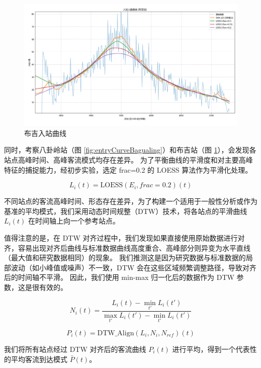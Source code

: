 \begin{figure}[htbp]
    \centering
    \includegraphics[width=1.0\textwidth]{res/Figure_3.png}
    \caption{布吉入站曲线}
    \label{fig:entryCurveBuji}
\end{figure}

同时，考察八卦岭站（图 \ref{fig:entryCurveBagualing}）和布吉站（图 \ref{fig:entryCurveBuji}），会发现各站点高峰时间、高峰客流模式均存在差异。
为了平衡曲线的平滑度和对主要高峰特征的捕捉能力，经初步实验，选定 frac=0.2 的 LOESS 算法作为平滑化处理。

$$
L_i(t) = \text{LOESS}(E_i, frac=0.2)(t)
$$

不同站点的客流高峰时间、形态存在差异，为了构建一个适用于一般性分析或作为基准的平均模式，我们采用动态时间规整（DTW）\cite{DTW}技术，将各站点的平滑曲线 $L_i(t)$ 在时间轴上向一个参考站点。

值得注意的是，在 DTW 对齐过程中，我们发现如果直接使用原始数据进行对齐，容易出现对齐后曲线与标准数据曲线高度重合、高峰部分则异变为水平直线（最大值和研究数据相同）的现象。
我们推测这是因为研究数据与标准数据的局部波动（如小峰值或噪声）不一致，DTW 会在这些区域频繁调整路径，导致对齐后的时间轴不平滑。
因此，我们使用 min-max 归一化后的数据作为 DTW 参数，这是很有效的。

$$
N_i(t) = \frac{L_i(t) - \min_{t'}L_i(t')}{\max_{t'}L_i(t') - \min_{t'}L_i(t')}
$$

$$
P_i(t) = \text{DTW\_Align}(L_i, N_i, N_{ref})(t)
$$

我们将所有站点经过 DTW 对齐后的客流曲线 $P_i(t)$ 进行平均，得到一个代表性的平均客流到达模式 $\bar{P}(t)$。

